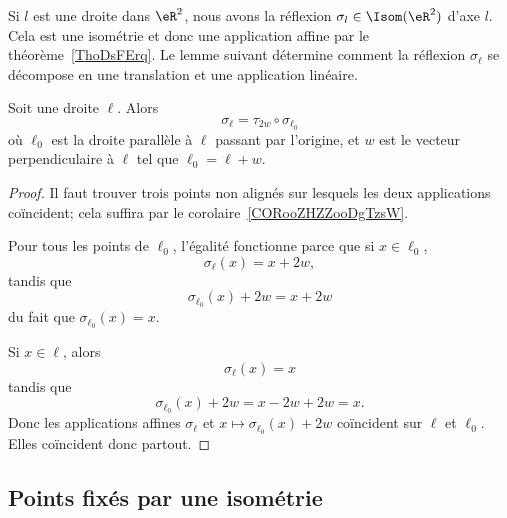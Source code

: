 \begin{normaltext}
	Si \( l\) est une droite dans \( \eR^2\), nous avons la réflexion \( \sigma_l\in\Isom(\eR^2)\) d'axe \( l\). Cela est une isométrie et donc une application affine par le théorème~\ref{ThoDsFErq}. Le lemme suivant détermine comment la réflexion \( \sigma_{\ell}\) se décompose en une translation et une application linéaire.
\end{normaltext}

\begin{lemma}   \label{LEMooVOJLooCFgdNG}
	Soit une droite \( \ell\). Alors
	\begin{equation}
		\sigma_{\ell}=\tau_{2w}\circ\sigma_{\ell_0}
	\end{equation}
	où \( \ell_0\) est la droite parallèle à \( \ell\) passant par l'origine, et \( w\) est le vecteur perpendiculaire à \( \ell\) tel que \( \ell_0=\ell+w\).
\end{lemma}

\begin{proof}
	Il faut trouver trois points non alignés sur lesquels les deux applications coïncident; cela suffira par le corolaire~\ref{CORooZHZZooDgTzsW}.

	Pour tous les points de \( \ell_0\), l'égalité fonctionne parce que si \( x\in\ell_0\),
	\begin{equation}
		\sigma_{\ell}(x)=x+2w,
	\end{equation}
	tandis que
	\begin{equation}
		\sigma_{\ell_0}(x)+2w=x+2w
	\end{equation}
	du fait que \( \sigma_{\ell_0}(x)=x\).

	Si \( x\in\ell\), alors
	\begin{equation}
		\sigma_{\ell}(x)=x
	\end{equation}
	tandis que
	\begin{equation}
		\sigma_{\ell_0}(x)+2w=x-2w+2w=x.
	\end{equation}
	Donc les applications affines \( \sigma_{\ell}\) et \( x\mapsto \sigma_{\ell_0}(x)+2w\) coïncident sur \( \ell\) et \( \ell_0\). Elles coïncident donc partout.
\end{proof}

\subsection{Points fixés par une isométrie}

